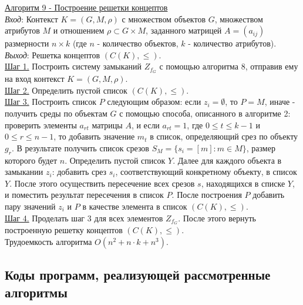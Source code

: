 \documentclass[bachelor, och, labwork]{shiza}
\begin{document}
        \underline{Алгоритм 9 - Построение решетки концептов}\\
            \textit{Вход}: Контекст $K = (G, M, \rho)$ с множеством объектов $G$, множеством атрибутов $M$ и отношением
            $\rho \subset G \times M$, заданного матрицей $A = (a_{ij})$ размерности $n \times k$ (где $n$ - количество
            объектов, $k$ - количество атрибутов). \\
            \textit{Выход}: Решетка концептов $(C(K), \leq)$. \\
            \underline{Шаг 1.} Построить систему замыканий $Z_{f_G}$ с помощью алгоритма 8, отправив ему на вход
            контекст $K = (G, M, \rho)$. \\
            \underline{Шаг 2.} Определить пустой список $(C(K), \leq)$.\\
            \underline{Шаг 3.} Построить список $P$ следующим образом: если $z_i = \emptyset$, то $P = M$, иначе -
            получить среды по объектам $G$ с помощью способа, описанного в алгоритме 2: проверить элементы $a_{rt}$
            матрицы $A$, и если $a_{rt} = 1$, где $0 \leq t \leq k - 1$ и $0 \leq r \leq n - 1$, то добавить значение
            $m_t$ в список, определяющий срез по объекту $g_r$. В результате получить список срезов $S_M = \{s_i = [m]:
            m \in M\}$, размер которого будет $n$. Определить пустой список $Y$. Далее для каждого объекта в замыкании
            $z_i$: добавить срез $s_i$, соответствующий конкретному объекту, в список $Y$. После этого осуществить
            пересечение всех срезов $s$, находящихся в списке $Y$, и поместить результат пересечения в список $P$. После
            построения $P$ добавить пару значений $z_i$ и $P$ в качестве элемента в список $(C(K), \leq)$.\\
            \underline{Шаг 4.} Проделать шаг 3 для всех элементов $Z_{f_G}$. После этого вернуть построенную решетку
            концептов $(C(K), \leq)$. \\

            Трудоемкость алгоритма $O(n^2 + n \cdot k + n^3)$.\\

    \subsection{Коды программ, реализующей рассмотренные алгоритмы}


        \inputminted[fontsize=\small]{Python}{code/aua-lab2.py}
\end{document}
